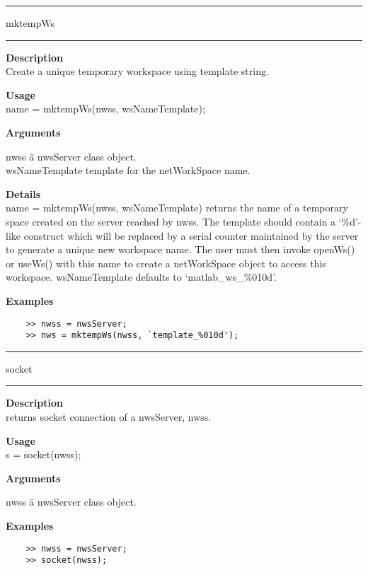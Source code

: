 \rule[0.06in]{6in}{0.01in}
\newline
mktempWs
\newline
\rule{6in}{0.01in}
\begin{list}{}{}
	\item {\bf Description}\\
	Create a unique temporary workspace using template string.

	\item {\bf Usage}\\
	name = mktempWs(nwss, wsNameTemplate);

	\item {\bf Arguments}
		\begin{tabbing}
		nwss \hspace{2.5cm} \= a nwsServer class object. \\
		wsNameTemplate \> template for the netWorkSpace name.
		\end{tabbing}
	\item {\bf Details}\\
	name = mktempWs(nwss, wsNameTemplate) returns the name of a temporary space created
	on the server reached by nwss. The template should contain a `\%d'-like construct
	which will be replaced by a serial counter maintained by the server to generate
	a unique new workspace name. The user must then invoke openWs() or useWs() with this name
	to create a netWorkSpace object to access this workspace. wsNameTemplate defaults to `matlab\_ws\_\%010d'.
		
	\item {\bf Examples}
	\begin{verbatim}
	>> nwss = nwsServer;
	>> nws = mktempWs(nwss, `template_%010d');
	\end{verbatim}
\end{list}

\rule[0.06in]{6in}{0.01in}
\newline
socket
\newline
\rule{6in}{0.01in}
\begin{list}{}{}
	\item {\bf Description}\\
	returns socket connection of a nwsServer, nwss.	
	\item {\bf Usage}\\
	s = socket(nwss);
	\item {\bf Arguments}
		\begin{tabbing}
		nwss \hspace{2.5cm} \= a nwsServer class object.
		\end{tabbing}	
	\item {\bf Examples}
	\begin{verbatim}
	>> nwss = nwsServer;
	>> socket(nwss);
	\end{verbatim}
\end{list}

